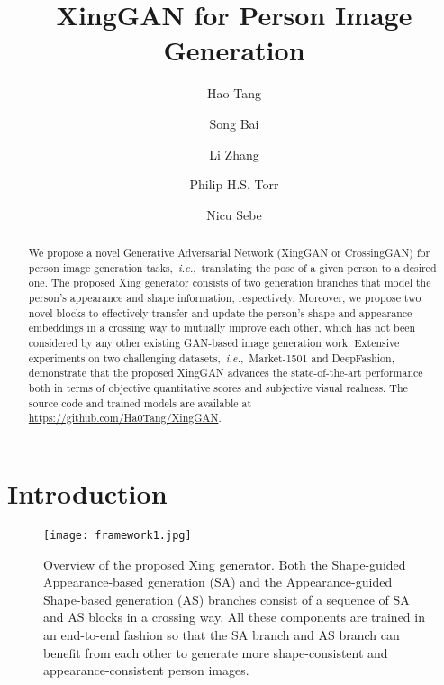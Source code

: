\documentclass[runningheads]{llncs}
\begin{document}
\pagestyle{headings}
\mainmatter
\def\ECCVSubNumber{100}  

\title{XingGAN for Person Image Generation} 

\begin{comment}
\titlerunning{ECCV-20 submission ID \ECCVSubNumber} 
\authorrunning{ECCV-20 submission ID \ECCVSubNumber} 
\author{Anonymous ECCV submission}
\institute{Paper ID \ECCVSubNumber}
\end{comment}


\author{Hao Tang \and
Song Bai \and
Li Zhang \and 
Philip H.S. Torr \and
Nicu Sebe
}
\maketitle

\begin{abstract}

We propose a novel Generative Adversarial Network (XingGAN or CrossingGAN) for person image generation tasks,~\emph{i.e.},~translating the pose of a given person to a desired one. The proposed Xing generator consists of two generation branches that model the person's appearance and shape information, respectively. Moreover, we propose two novel blocks to effectively transfer and update the person's shape and appearance embeddings in a crossing way to mutually improve each other, which has not been considered by any other existing GAN-based image generation work. Extensive experiments on two challenging datasets,~\emph{i.e.},~Market-1501 and DeepFashion, demonstrate that the proposed XingGAN advances the state-of-the-art performance both in terms of objective quantitative scores and subjective visual realness.
The source code and trained models are available at
\url{https://github.com/Ha0Tang/XingGAN}.

\end{abstract} \section{Introduction}
\begin{figure}[t]
	\centering
	\texttt{[image: framework1.jpg]}
	\caption{Overview of the proposed Xing generator. Both the Shape-guided Appearance-based generation (SA) and the  Appearance-guided Shape-based generation (AS) branches consist of a sequence of SA and AS blocks in a crossing way. All these components are trained in an end-to-end fashion so that the SA branch and AS branch can benefit from each other to generate more shape-consistent and appearance-consistent person images.}
	\label{fig:method}
\end{figure}
\end{document}
